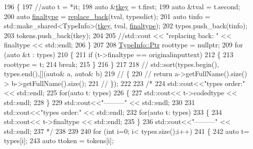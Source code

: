 \begin{DoxyCode}
196     \{
197         \textcolor{comment}{//auto t = *it;}
198         \textcolor{keyword}{auto} &\hyperlink{classsmacc_1_1introspection_1_1TypeInfo_a697dd505119258dba1224d10eea5b2bd}{tkey} = t.first;
199         \textcolor{keyword}{auto} &tval = t.second;
200         \textcolor{keyword}{auto} \hyperlink{classsmacc_1_1introspection_1_1TypeInfo_aa4010ed427e12db443e08ab16a3de243}{finaltype} = \hyperlink{namespacesmacc_1_1introspection_a19350163cda321a04645dcd6f6585f24}{replace\_back}(tval, typesdict);
201         \textcolor{keyword}{auto} tinfo = std::make\_shared<TypeInfo>(\hyperlink{classsmacc_1_1introspection_1_1TypeInfo_a697dd505119258dba1224d10eea5b2bd}{tkey}, tval, \hyperlink{classsmacc_1_1introspection_1_1TypeInfo_aa4010ed427e12db443e08ab16a3de243}{finaltype});
202         types.push\_back(tinfo);
203         tokens.push\_back(tkey);
204 
205         \textcolor{comment}{//std::cout << "replacing back: " << finaltype << std::endl;}
206     \}
207 
208     \hyperlink{classsmacc_1_1introspection_1_1TypeInfo_aa6ffd9c39811d59f7c771941b7fad860}{TypeInfo::Ptr} roottype = \textcolor{keyword}{nullptr};
209     \textcolor{keywordflow}{for} (\textcolor{keyword}{auto} &t : types)
210     \{
211         \textcolor{keywordflow}{if} (t->finaltype == originalinputtext)
212         \{
213             roottype = t;
214             \textcolor{keywordflow}{break};
215         \}
216     \}
217 
218     \textcolor{comment}{// std::sort(types.begin(), types.end(),[](auto& a, auto& b)}
219     \textcolor{comment}{// \{}
220     \textcolor{comment}{//     return a->getFullName().size() > b->getFullName().size();}
221     \textcolor{comment}{// \});}
222 
223     \textcolor{comment}{/*}
224 \textcolor{comment}{    std::cout<<"types order:" << std::endl;}
225 \textcolor{comment}{    for(auto t: types)}
226 \textcolor{comment}{    \{}
227 \textcolor{comment}{        std::cout<< t->codedtype << std::endl;}
228 \textcolor{comment}{    \}}
229 \textcolor{comment}{    std::cout<<"---------" << std::endl;}
230 \textcolor{comment}{}
231 \textcolor{comment}{    std::cout<<"types order:" << std::endl;}
232 \textcolor{comment}{    for(auto t: types)}
233 \textcolor{comment}{    \{}
234 \textcolor{comment}{        std::cout<< t->finaltype << std::endl;}
235 \textcolor{comment}{    \}}
236 \textcolor{comment}{    std::cout<<"---------" << std::endl;}
237 \textcolor{comment}{    */}
238 
239     
240     \textcolor{keywordflow}{for} (\textcolor{keywordtype}{int} i=0; i< types.size();i++)
241     \{
242         \textcolor{keyword}{auto} t= types[i];
243         \textcolor{keyword}{auto} ttoken = tokens[i];

\end{DoxyCode}
